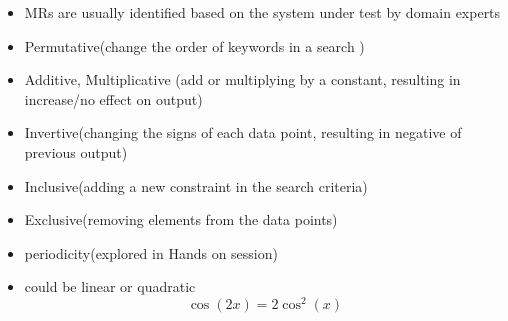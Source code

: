 \begin{frame}[fragile]
		\begin{itemize}
			
			\item MRs are usually identified based on the system under test by domain experts
			\item Permutative(change the order of keywords in a search )
			\item Additive, Multiplicative (add or multiplying by a constant, resulting in increase/no effect on output)
			\item Invertive(changing the signs of each data point, resulting in negative of previous output)
			\item Inclusive(adding a new constraint in the search criteria)
			\item Exclusive(removing elements from the data points)
			\item periodicity(explored in Hands on session)
			\item could be linear or quadratic $$ \cos{(2x)} = 2{\cos} ^2  (x)   $$
		\end{itemize}		
	
\end{frame}